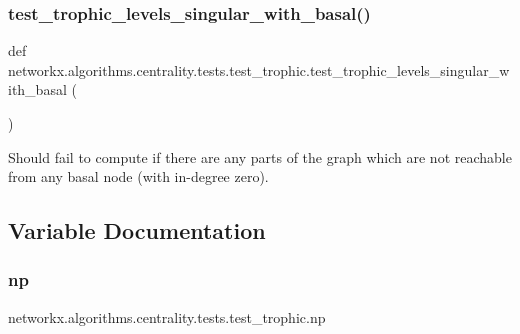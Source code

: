 \subsubsection{\texorpdfstring{test\+\_\+trophic\+\_\+levels\+\_\+singular\+\_\+with\+\_\+basal()}{test\_trophic\_levels\_singular\_with\_basal()}}
{\footnotesize\ttfamily def networkx.\+algorithms.\+centrality.\+tests.\+test\+\_\+trophic.\+test\+\_\+trophic\+\_\+levels\+\_\+singular\+\_\+with\+\_\+basal (\begin{DoxyParamCaption}{ }\end{DoxyParamCaption})}

\begin{DoxyVerb}Should fail to compute if there are any parts of the graph which are not
reachable from any basal node (with in-degree zero).
\end{DoxyVerb}
 

\subsection{Variable Documentation}
\mbox{\label{namespacenetworkx_1_1algorithms_1_1centrality_1_1tests_1_1test__trophic_a6c14363129d22148b8394c8023b360c8}} 
\subsubsection{\texorpdfstring{np}{np}}
{\footnotesize\ttfamily networkx.\+algorithms.\+centrality.\+tests.\+test\+\_\+trophic.\+np}

